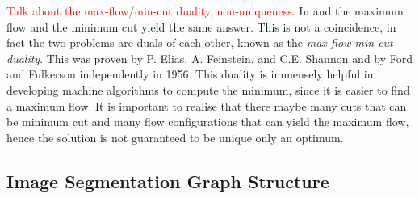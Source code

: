 \textcolor{red}{Talk about the max-flow/min-cut duality, non-uniqueness.}
In  and  the maximum flow and the minimum cut yield the same answer. This is not a coincidence, in fact the two problems are duals of each other, known as the \textit{max-flow min-cut duality}. This was proven by P. Elias, A. Feinstein, and C.E. Shannon \citep{Elias1956} and by Ford and Fulkerson \citep{Ford1956} independently in 1956. This duality is immensely helpful in developing machine algorithms to compute the minimum, since it is easier to find a maximum flow. It is important to realise that there maybe many cuts that can be minimum cut and many flow configurations that can yield the maximum flow, hence the solution is not guaranteed to be unique only an optimum.


\subsection{Image Segmentation Graph Structure}
\label{sec:GraphCutFramework}

